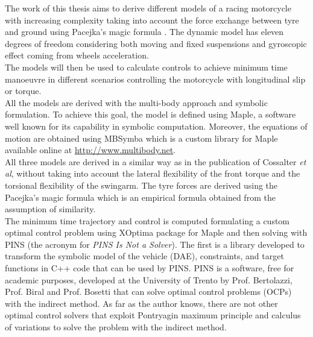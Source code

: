 %
The work of this thesis aims to derive different models of a racing motorcycle with increasing complexity taking into account the force exchange between tyre and ground using Pacejka's magic formula \cite{pacejka2006tyre}. The dynamic model has eleven degrees of freedom considering both moving and fixed suspensions and gyroscopic effect coming from wheels acceleration.\\ 
The models will then be used to calculate controls to achieve minimum time manoeuvre in different scenarios controlling the motorcycle with longitudinal slip or torque.\\
%
%
All the models are derived with the multi-body approach and symbolic formulation. To achieve this goal, the model is defined using Maple, a software well known for its capability in symbolic computation. Moreover, the equations of motion are obtained using MBSymba which is a custom library for Maple available online at \url{http://www.multibody.net}.\\
All three models are derived in a similar way as in the publication of Cossalter \textit{et al}\cite{cossalter2007influence}, without taking into account the lateral flexibility of the front torque and the torsional flexibility of the swingarm. The tyre forces are derived using the Pacejka's magic formula \cite{pacejka2006tyre} which is an empirical formula obtained from the assumption of similarity.\\
The minimum time trajectory and control is computed formulating a custom optimal control problem using XOptima package for Maple and then solving with PINS (the acronym for \textit{PINS Is Not a Solver}). The first is a library developed to transform the symbolic model of the vehicle (DAE), constraints, and target functions in C++ code that can be used by PINS. PINS is a software, free for academic purposes, developed at the University of Trento by Prof. Bertolazzi, Prof. Biral and Prof. Bosetti that can solve optimal control problems (OCPs) with the indirect method. As far as the author knows, there are not other optimal control solvers that exploit Pontryagin maximum principle and calculus of variations to solve the problem with the indirect method. \cite{bertolazzi2006symbolic}\\
